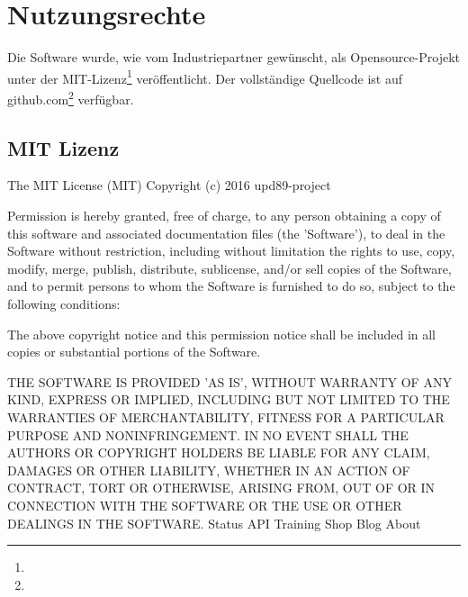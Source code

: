 \chapter{Nutzungsrechte}

Die Software wurde, wie vom Industriepartner gewünscht, als Opensource-Projekt unter der MIT-Lizenz\footnote{} veröffentlicht. Der vollständige Quellcode ist auf github.com\footnote{} verfügbar.

\xxx[ausformulieren]

\section*{MIT Lizenz}
The MIT License (MIT)
Copyright (c) 2016 upd89-project

Permission is hereby granted, free of charge, to any person obtaining a copy of this software and associated documentation files (the 'Software'), to deal in the Software without restriction, including without limitation the rights to use, copy, modify, merge, publish, distribute, sublicense, and/or sell copies of the Software, and to permit persons to whom the Software is furnished to do so, subject to the following conditions:

The above copyright notice and this permission notice shall be included in all copies or substantial portions of the Software.

THE SOFTWARE IS PROVIDED 'AS IS', WITHOUT WARRANTY OF ANY KIND, EXPRESS OR IMPLIED, INCLUDING BUT NOT LIMITED TO THE WARRANTIES OF MERCHANTABILITY, FITNESS FOR A PARTICULAR PURPOSE AND NONINFRINGEMENT. IN NO EVENT SHALL THE AUTHORS OR COPYRIGHT HOLDERS BE LIABLE FOR ANY CLAIM, DAMAGES OR OTHER LIABILITY, WHETHER IN AN ACTION OF CONTRACT, TORT OR OTHERWISE, ARISING FROM, OUT OF OR IN CONNECTION WITH THE SOFTWARE OR THE USE OR OTHER DEALINGS IN THE SOFTWARE.
Status API Training Shop Blog About
